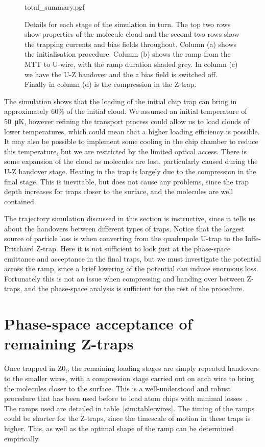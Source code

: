 \begin{figure}[p]
\centering
  {total_summary.pgf}
  \caption{
    Details for each stage of the simulation in turn. The top two rows show
    properties of the molecule cloud and the second two rows show the trapping
    currents and bias fields throughout. Column (a) shows the initialisation
    procedure. Column (b) shows the ramp from the MTT to U-wire, with the ramp
    duration shaded grey.  In column (c) we have the U-Z handover and the $z$
    bias field is switched off. Finally in column (d) is the compression in the
    Z-trap.
  }
  \label{sim:fig:simsum}
\end{figure}

The simulation shows that the loading of the initial chip trap can bring in
approximately 60\% of the initial cloud. We assumed an initial temperature of
\SI{50}{\micro\kelvin}, however refining the transport process could allow us
to load clouds of lower temperatures, which could mean that a higher loading
efficiency is possible. It may also be possible to implement some cooling in
the chip chamber to reduce this temperature, but we are restricted by the
limited optical access.
%
There is some expansion of the cloud as molecules are lost, particularly caused
during the U-Z handover stage.
%
Heating in the trap is largely due to the compression in the final stage. This
is inevitable, but does not cause any problems, since the trap depth
increases for traps closer to the surface, and the molecules are
well contained.

The trajectory simulation discussed in this section is instructive, since it
tells us about the handovers between different types of traps. Notice
that the largest source of particle loss is when converting from the quadrupole
U-trap to the Ioffe-Pritchard Z-trap. Here it is not sufficient to look just at
the phase-space emittance and acceptance in the final traps, but we must
investigate the potential across the ramp, since a brief lowering of the
potential can induce enormous loss. Fortunately this is not an issue when
compressing and handing over between Z-traps, and the phase-space analysis is
sufficient for the rest of the procedure.

\section{Phase-space acceptance of remaining Z-traps}
\label{sim:transferbetweenzs}

Once trapped in $\mathrm{Z0_f}$, the remaining loading stages are simply
repeated handovers to the smaller wires, with a compression stage carried out
on each wire to bring the molecules closer to the surface. This is a
well-understood and robust procedure that has been used before to load atom
chips with minimal losses~\cite{Reichel2002}. The ramps used are detailed in
table~\ref{sim:table:wires}.  The timing of the ramps could be shorter for
the Z-traps, since the timescale of motion in these traps is higher. This, as
well as the optimal shape of the ramp can be determined empirically.

